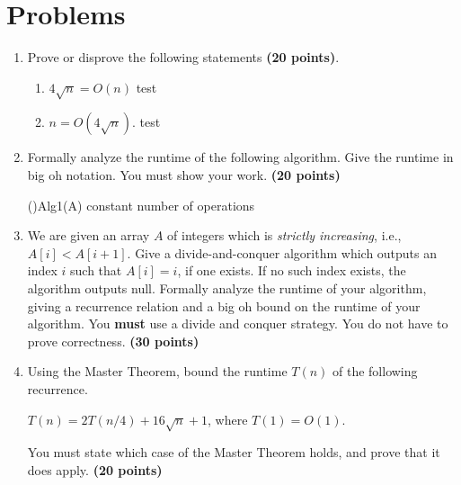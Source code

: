 \documentclass[11pt]{amsart}
\begin{document}
\section*{Problems}

\begin{enumerate}

\item Prove or disprove the following statements \textbf{(20 points)}.
\begin{enumerate}
\item $4\sqrt{n} = O(n)$
\subitem test
\item $n = O(4\sqrt{n})$.
\subitem test
\end{enumerate}




\bigskip

\item Formally analyze the runtime of the following algorithm. Give the runtime in big oh notation. You must show your work. \textbf{(20 points)}

\smallskip

\begin{algorithm}[H]
\Fn(){Alg1(A)}{
\SetAlgoLined
\SetNoFillComment
\DontPrintSemicolon
	constant number of operations \\
}
\end{algorithm}



\bigskip

\item We are given an array $A$ of integers which is \textit{strictly increasing}, i.e., $A[i] < A[i+1]$. Give a divide-and-conquer algorithm which outputs an index $i$ such that $A[i] = i$, if one exists. If no such index exists, the algorithm outputs null. Formally analyze the runtime of your algorithm, giving a recurrence relation and a big oh bound on the runtime of your algorithm. You \textbf{must} use a divide and conquer strategy. You do not have to prove correctness. \textbf{(30 points)}

\bigskip

\item Using the Master Theorem, bound the runtime $T(n)$ of the following recurrence. 
\begin{center}
$T(n) = 2T(n/4) + 16\sqrt{n} + 1$, where $T(1) = O(1)$.
\end{center}
You must state which case of the Master Theorem holds, and prove that it does apply. \textbf{(20 points)}


\end{enumerate}
\end{document}
